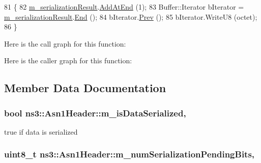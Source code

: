 \begin{DoxyCode}
81 \{
82   \hyperlink{classns3_1_1Asn1Header_a758b74023ea5bf40941af6f0a6a66058}{m\_serializationResult}.\hyperlink{classns3_1_1Buffer_a92dd87809af24fb10696fee9a9cb56cf}{AddAtEnd} (1);
83   Buffer::Iterator bIterator = \hyperlink{classns3_1_1Asn1Header_a758b74023ea5bf40941af6f0a6a66058}{m\_serializationResult}.\hyperlink{classns3_1_1Buffer_a52207c7aed7bae89fba2f9e997c82724}{End} ();
84   bIterator.\hyperlink{classns3_1_1Buffer_1_1Iterator_a9913fb3b506a9f6efe46060531f051d8}{Prev} ();
85   bIterator.WriteU8 (octet);
86 \}
\end{DoxyCode}


Here is the call graph for this function\+:




Here is the caller graph for this function\+:




\subsection{Member Data Documentation}
\subsubsection[{\texorpdfstring{m\+\_\+is\+Data\+Serialized}{m_isDataSerialized}}]{\setlength{\rightskip}{0pt plus 5cm}bool ns3\+::\+Asn1\+Header\+::m\+\_\+is\+Data\+Serialized\hspace{0.3cm}{\ttfamily [mutable]}, {\ttfamily [protected]}}\hypertarget{classns3_1_1Asn1Header_ae39d42f09e8ec85d8180843625fc92ba}{}\label{classns3_1_1Asn1Header_ae39d42f09e8ec85d8180843625fc92ba}


true if data is serialized 

\subsubsection[{\texorpdfstring{m\+\_\+num\+Serialization\+Pending\+Bits}{m_numSerializationPendingBits}}]{\setlength{\rightskip}{0pt plus 5cm}uint8\+\_\+t ns3\+::\+Asn1\+Header\+::m\+\_\+num\+Serialization\+Pending\+Bits\hspace{0.3cm}{\ttfamily [mutable]}, {\ttfamily [protected]}}\hypertarget{classns3_1_1Asn1Header_a663fc3287a1e7e4c383575e432480e6c}{}\label{classns3_1_1Asn1Header_a663fc3287a1e7e4c383575e432480e6c}


